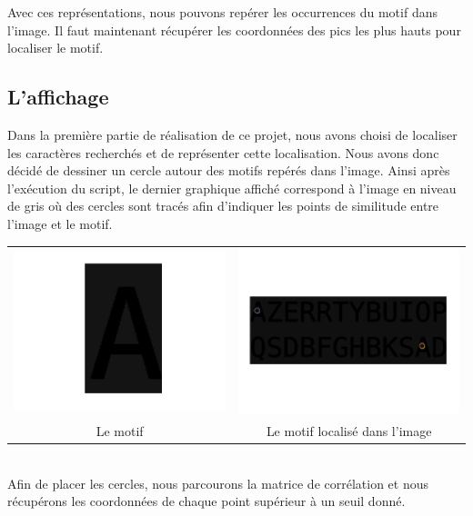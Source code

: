 \documentclass[a4paper,12pt,titlepage]{report}
\begin{document}
	Avec ces représentations, nous pouvons repérer les occurrences du motif dans l'image. Il faut maintenant récupérer les coordonnées des pics les plus hauts pour localiser le motif.
	\subsection{L'affichage}
	Dans la première partie de réalisation de ce projet, nous avons choisi de localiser les caractères recherchés et de représenter cette localisation. Nous avons donc décidé de dessiner un cercle autour des motifs repérés dans l'image.
	Ainsi après l'exécution du script, le dernier graphique affiché correspond à l'image en niveau de gris où des cercles sont tracés afin d'indiquer les points de similitude entre l'image et le motif.\\
	\begin{tabular}{|c|c|}
			\includegraphics[scale=0.2]{illus/motifm0.png} & \includegraphics[scale=0.25]{illus/motiflocal.png}\\
			Le motif  & Le motif localisé dans l'image\\
	\end{tabular}\\
	Afin de placer les cercles, nous parcourons la matrice de corrélation et nous récupérons les coordonnées de chaque point supérieur à un seuil donné. 
\end{document}
